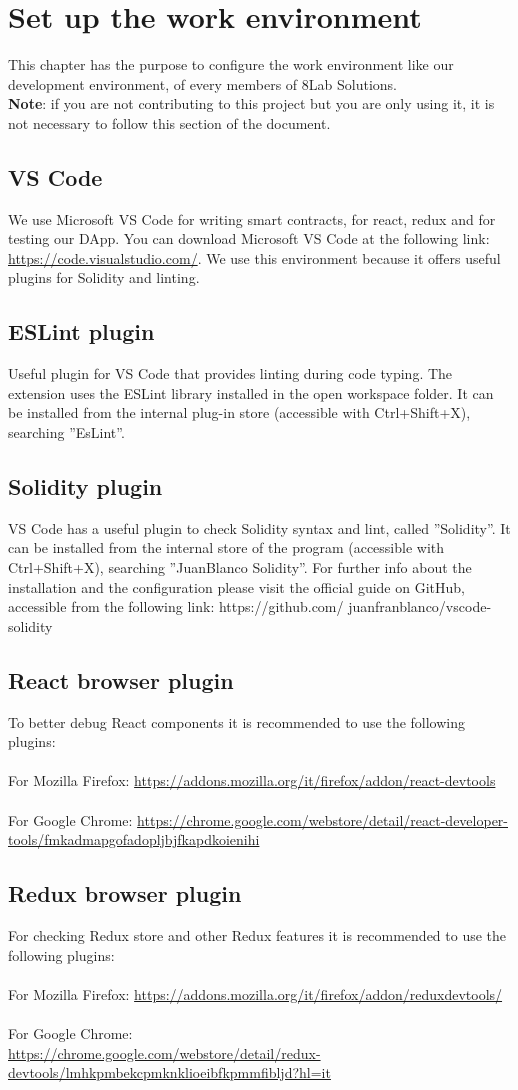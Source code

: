 \section{Set up the work environment}
This chapter has the purpose to configure the work environment like our development environment, of every members of 8Lab Solutions. \\
\textbf{Note}: if you are not contributing to this project but you are only using it, it
is not necessary to follow this section of the document.
\subsection{VS Code}
We use Microsoft VS Code for writing smart contracts, for react, redux and for testing our DApp. You can download Microsoft VS Code at the following link: \url{https://code.visualstudio.com/}. We use this environment because it offers useful plugins for Solidity and linting.
\subsection{ESLint plugin}
Useful plugin for VS Code that provides linting during code typing. The extension uses the ESLint library installed in the open workspace folder.
It can be installed from the internal plug-in store (accessible with Ctrl+Shift+X),
searching ”EsLint”.
\subsection{Solidity plugin}
VS Code has a useful plugin to check Solidity syntax and lint, called ”Solidity”.
It can be installed from the internal store of the program (accessible with Ctrl+Shift+X),
searching ”JuanBlanco Solidity”.
For further info about the installation and the configuration please visit the official guide on GitHub, accessible from the following link:
https://github.com/
juanfranblanco/vscode-solidity
\subsection{React browser plugin}
To better debug React components it is recommended to use the following plugins: \\ \\
For Mozilla Firefox:
\url{https://addons.mozilla.org/it/firefox/addon/react-devtools} \\ \\
For Google Chrome:
\url{https://chrome.google.com/webstore/detail/react-developer-tools/fmkadmapgofadopljbjfkapdkoienihi}
\subsection{Redux browser plugin}
For checking Redux store and other Redux features it is recommended to use the following plugins: \\ \\
For Mozilla Firefox:
\url{https://addons.mozilla.org/it/firefox/addon/reduxdevtools/} \\ \\
For Google Chrome: \\
\url{https://chrome.google.com/webstore/detail/redux-devtools/lmhkpmbekcpmknklioeibfkpmmfibljd?hl=it}
